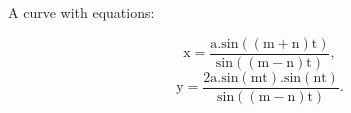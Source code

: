 A curve with equations:
\par
 \[ \mathrm{x} = \frac{\mathrm{a.sin((m+n)t)}}{\mathrm{sin((m-n)t)}} , \]
\[ \mathrm{y} = \frac{ 2 \mathrm{a.sin(mt).sin(nt)}}{\mathrm{sin((m-n)t)}} . \]